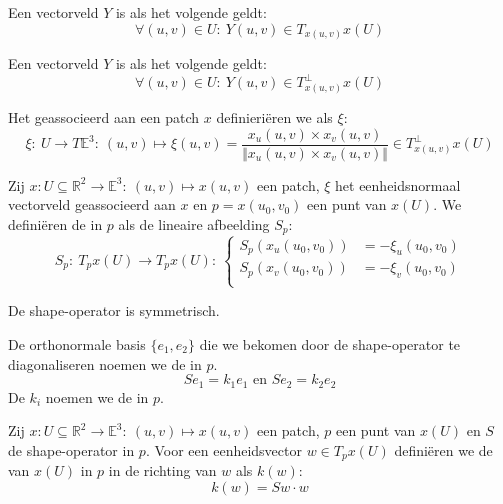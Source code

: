 \documentclass[main.tex]{subfiles}
\begin{document}
\begin{de}
  Een vectorveld $Y$ is  als het volgende geldt:
  \[ \forall (u,v) \in U:\ Y(u,v) \in T_{x(u,v)}x(U) \]
\end{de}

\begin{de}
  Een vectorveld $Y$ is  als het volgende geldt:
  \[ \forall (u,v) \in U:\ Y(u,v) \in T_{x(u,v)}^{\bot}x(U) \]
\end{de}

\begin{de}
  Het  geassocieerd aan een patch $x$ definieri\"eren we als $\xi$:
  \[ \xi:\ U \rightarrow T\mathbb{E}^{3}:\ (u,v) \mapsto \xi(u,v) = \frac{x_{u}(u,v) \times x_{v}(u,v)}{\Vert x_{u}(u,v) \times x_{v}(u,v) \Vert} \in T_{x(u,v)}^{\bot}x(U) \]
\end{de}

\begin{de}
  Zij $x: U \subseteq \mathbb{R}^{2} \rightarrow \mathbb{E}^{3}:\ (u,v) \mapsto x(u,v)$ een patch, $\xi$ het eenheidsnormaal vectorveld geassocieerd aan $x$ en $p=x(u_{0},v_{0})$ een punt van $x(U)$.
  We defini\"eren de  in $p$ als de lineaire afbeelding $S_{p}$:
  \[
  S_{p}:\ T_{p}x(U) \rightarrow T_{p}x(U):\ 
  \left\{
    \begin{array}{rl}
      S_{p}(x_{u}(u_{0},v_{0})) &= -\xi_{u}(u_{0},v_{0})\\
      S_{p}(x_{v}(u_{0},v_{0})) &= -\xi_{v}(u_{0},v_{0})\\
    \end{array}
  \right.
  \]
\end{de}

\begin{lem}
  De shape-operator is symmetrisch.
\end{lem}

\begin{de}
  De orthonormale basis $\{e_{1},e_{2}\}$ die we bekomen door de shape-operator te diagonaliseren noemen we de  in $p$.
  \[ Se_{1}=k_{1}e_{1} \text{ en } Se_{2}= k_{2}e_{2} \]
  De $k_{i}$ noemen we de  in $p$.
\end{de}

\begin{de}
  Zij  $x: U \subseteq \mathbb{R}^{2} \rightarrow \mathbb{E}^{3}:\ (u,v) \mapsto x(u,v)$ een patch, $p$ een punt van $x(U)$ en $S$ de shape-operator in $p$.
  Voor een eenheidsvector $w\in T_{p}x(U)$ defini\"eren we de \term{normale kromming} van $x(U)$ in $p$ in de richting van $w$ als $k(w)$:
  \[ k(w) = Sw \cdot w \]
\end{de}
\end{document}
